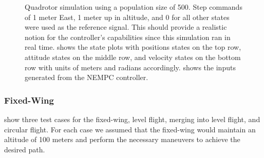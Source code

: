 \documentclass[letterpaper, 10 pt, conference]{ieeeconf}  %
\begin{document}
	\begin{figure}[htbp]
		\centering
		\qquad
		\caption{Quadrotor simulation using a population size of 500. Step commands of 1 meter East, 1 meter up in altitude, and 0 for all other states were used as the reference signal. This should provide a realistic notion for the controller's capabilities since this simulation ran in real time.  shows the state plots with positions states on the top row, attitude states on the middle row, and velocity states on the bottom row with units of meters and radians accordingly.  shows the inputs generated from the NEMPC controller.}
		\label{fig:quad_sim500}
	\end{figure}
	
	\subsubsection{Fixed-Wing}
	
	 show three test cases for the fixed-wing, level flight, merging into level flight, and circular flight. For each case we assumed that the fixed-wing would maintain an altitude of 100 meters and perform the necessary maneuvers to achieve the desired path. 
	
\end{document}
